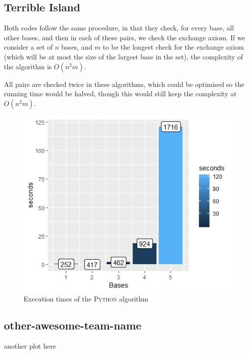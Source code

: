 \documentclass[11pt]{amsart}
\begin{document}
\subsection{Terrible Island}

Both codes follow the same procedure, in that they check, for every base, all other bases, and then in each of these pairs, we check the exchange axiom. If we consider a set of $n$ bases, and $m$ to be the longest check for the exchange axiom (which will be at most the size of the largest base in the set), the complexity of the algorithm is $O(n^{2}m)$.

All pairs are checked twice in these algorithms, which could be optimised so the running time would be halved, though this would still keep the complexity at $O(n^{2}m)$.

\begin{figure}[h!]
    \centering
    \includegraphics[width=.7\textwidth]{./Terrible-Island/times.jpeg}
    \caption{Execution times of the \textsc{Python} algorithm}
\end{figure}

\subsection{other-awesome-team-name}

another plot here
\end{document}

